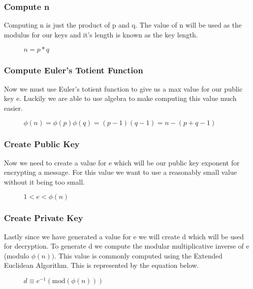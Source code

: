 \documentclass[conference]{IEEEtran}
\begin{document}
\subsubsection{Compute n}
Computing n is just the product of p and q. The value of n will be used as the modulus for our keys and it's length is known as the key length.

\begin{figure}[h]
	\begin{center}
		$n=p * q$
	\end{center}
\end{figure}

\subsubsection{Compute Euler's Totient Function}
Now we must use Euler's totient function to give us a max value for our public key e.
Luckily we are able to use algebra to make computing this value much easier.
\begin{figure}[h]
	\begin{center}
		$\phi \left(n\right)=\phi \left(p\right)\phi \left(q\right)=\left(p-1\right)\left(q-1\right)=n-\left(p+q-1\right)$
	\end{center}
\end{figure}

\subsubsection{Create Public Key}
Now we need to create a value for e which will be our public key exponent for encrypting a message. For this value we want to use a reasonably small value without it being too small.
\begin{figure}[h]
	\begin{center}
		$1 < e < \phi \left(n\right)$
	\end{center}
\end{figure}
\subsubsection{Create Private Key}
Lastly since we have generated a value for e we will create d which will be used for decryption. To generate d we compute the modular multiplicative inverse of e (modulo $ \phi \left(n\right))$. This value is commonly computed using the Extended Euclidean Algorithm. This is represented by the equation below.
\begin{figure}[h]
	\begin{center}
		$d\equiv {e}^{-1}\left(\mathrm{mod}\left(\phi \left(n\right)\right)\right)$
	\end{center}
\end{figure}
\end{document}
